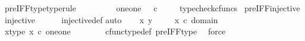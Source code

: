 \begin{isabellebody}
\isanewline
{}\isamarkupfalse%
\ pre{\isacharunderscore}{\kern0pt}IFF{\isacharunderscore}{\kern0pt}type{\isacharbrackleft}{\kern0pt}type{\isacharunderscore}{\kern0pt}rule{\isacharbrackright}{\kern0pt}{\isacharcolon}{\kern0pt}\ \isanewline
\ \ {\isachardoublequoteopen}{\isasymlangle}{\isasymt}{\isacharcomma}{\kern0pt}\ {\isasymt}{\isasymrangle}\ {\isasymamalg}\ {\isasymlangle}{\isasymf}{\isacharcomma}{\kern0pt}\ {\isasymf}{\isasymrangle}\ {\isacharcolon}{\kern0pt}\ one{\isasymCoprod}one\ {\isasymrightarrow}\ {\isasymOmega}\ {\isasymtimes}\isactrlsub c\ {\isasymOmega}{\isachardoublequoteclose}\isanewline
%
\isadelimproof
\ \ %
\endisadelimproof
%
\isatagproof
{}\isamarkupfalse%
\ typecheck{\isacharunderscore}{\kern0pt}cfuncs%
\endisatagproof
{\isafoldproof}%
%
\isadelimproof
\isanewline
%
\endisadelimproof
\isanewline
{}\isamarkupfalse%
\ pre{\isacharunderscore}{\kern0pt}IFF{\isacharunderscore}{\kern0pt}injective{\isacharcolon}{\kern0pt}\isanewline
\ {\isachardoublequoteopen}injective{\isacharparenleft}{\kern0pt}{\isasymlangle}{\isasymt}{\isacharcomma}{\kern0pt}\ {\isasymt}{\isasymrangle}\ {\isasymamalg}{\isasymlangle}{\isasymf}{\isacharcomma}{\kern0pt}\ {\isasymf}{\isasymrangle}{\isacharparenright}{\kern0pt}{\isachardoublequoteclose}\isanewline
%
\isadelimproof
\ %
\endisadelimproof
%
\isatagproof
{}\isamarkupfalse%
\ injective{\isacharunderscore}{\kern0pt}def\isanewline
{}\isamarkupfalse%
{\isacharparenleft}{\kern0pt}auto{\isacharparenright}{\kern0pt}\isanewline
\ \ \isamarkupfalse%
\ x\ y\ \isanewline
\ \ \isamarkupfalse%
\ {\isachardoublequoteopen}x\ {\isasymin}\isactrlsub c\ domain\ {\isacharparenleft}{\kern0pt}{\isasymlangle}{\isasymt}{\isacharcomma}{\kern0pt}\ {\isasymt}{\isasymrangle}\ {\isasymamalg}{\isasymlangle}{\isasymf}{\isacharcomma}{\kern0pt}\ {\isasymf}{\isasymrangle}{\isacharparenright}{\kern0pt}{\isachardoublequoteclose}\ \isanewline
\ \ \isamarkupfalse%
\ \isamarkupfalse%
\ x{\isacharunderscore}{\kern0pt}type{\isacharcolon}{\kern0pt}\ {\isachardoublequoteopen}x\ {\isasymin}\isactrlsub c\ {\isacharparenleft}{\kern0pt}one{\isasymCoprod}one{\isacharparenright}{\kern0pt}{\isachardoublequoteclose}\ \ \isanewline
\ \ \ \ \isamarkupfalse%
\ cfunc{\isacharunderscore}{\kern0pt}type{\isacharunderscore}{\kern0pt}def\ pre{\isacharunderscore}{\kern0pt}IFF{\isacharunderscore}{\kern0pt}type\ \isamarkupfalse%
\ force\isanewline
\ \ \isamarkupfalse%
\ \isamarkupfalse%

\end{isabellebody}
